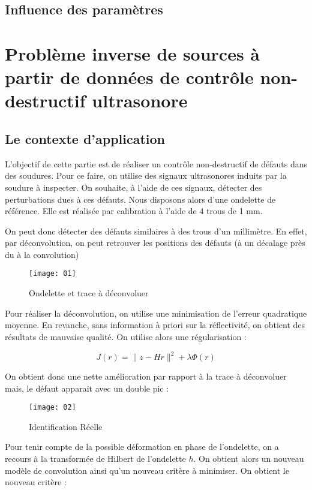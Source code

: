 \documentclass[12pt,a4paper,titlepage]{scrartcl}
\begin{document}
\subsection{Influence des paramètres}

\pagebreak

\section{Problème inverse de sources à partir de données de contrôle
non-destructif ultrasonore}

\subsection{Le contexte d'application}

L'objectif de cette partie est de réaliser un contrôle non-destructif
de défauts dans des soudures. Pour ce faire, on utilise des signaux
ultrasonores induits par la soudure à inspecter.
On souhaite, à l'aide de ces signaux, détecter des perturbations dues
à ces défauts. Nous disposons alors d'une ondelette de
référence. Elle est réalisée par calibration à l'aide de 4 trous de
1 mm.

On peut donc détecter des défauts similaires à des trous d'un millimètre.
En effet, par déconvolution, on peut retrouver les positions des défauts
(à un décalage près du à la convolution)

\begin{figure}[H]
    \caption{Ondelette et trace à déconvoluer}
    \texttt{[image: 01]}
    \centering
\end{figure}

Pour réaliser la déconvolution, on utilise une minimisation de l'erreur
quadratique moyenne. En revanche, sans information à priori sur la
réflectivité, on obtient des résultats de mauvaise qualité. On utilise
alors une régularisation :

$$ J(r) = \lVert z - Hr \rVert^2 + \lambda \Phi(r) $$

On obtient donc une nette amélioration par rapport à la trace à déconvoluer mais,
le défaut apparait avec un double pic :

\begin{figure}[H]
    \caption{Identification Réelle}
    \texttt{[image: 02]}
    \centering
\end{figure}

Pour tenir compte de la possible déformation en phase de l'ondelette,
on a recours à la transformée de Hilbert de l'ondelette $h$. On obtient
alors un nouveau modèle de convolution ainsi qu'un nouveau critère
à minimiser. On obtient le nouveau critère :
\end{document}
